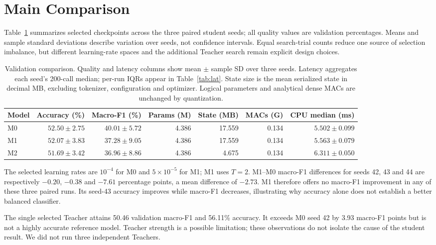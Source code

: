 \documentclass[11pt]{article}
\begin{document}
\section{Main Comparison}
Table~\ref{tab:main} summarizes selected checkpoints across the three paired student seeds; all quality values are validation percentages. Means and sample standard deviations describe variation over seeds, not confidence intervals. Equal search-trial counts reduce one source of selection imbalance, but different learning-rate spaces and the additional Teacher search remain explicit design choices.

\begin{table}[t]\centering\small
\begin{tabular}{lrrrrrr}\toprule
Model & Accuracy (\%) & Macro-F1 (\%) & Params (M) & State (MB) & MACs (G) & CPU median (ms)\\\midrule
M0 & $52.50\pm2.75$ & $40.01\pm5.72$ & 4.386 & 17.559 & 0.134 & $5.502\pm0.099$\\
M1 & $52.07\pm3.83$ & $37.28\pm9.05$ & 4.386 & 17.559 & 0.134 & $5.563\pm0.079$\\
M2 & $51.69\pm3.42$ & $36.96\pm8.86$ & 4.386 & 4.675 & 0.134 & $6.311\pm0.050$\\\bottomrule
\end{tabular}
\caption{Validation comparison. Quality and latency columns show mean $\pm$ sample SD over three seeds. Latency aggregates each seed's 200-call median; per-run IQRs appear in Table~\ref{tab:lat}. State size is the mean serialized state in decimal MB, excluding tokenizer, configuration and optimizer. Logical parameters and analytical dense MACs are unchanged by quantization.}\label{tab:main}
\end{table}

The selected learning rates are $10^{-4}$ for M0 and $5\times10^{-5}$ for M1; M1 uses $T=2$. M1--M0 macro-F1 differences for seeds 42, 43 and 44 are respectively $-0.20$, $-0.38$ and $-7.61$ percentage points, a mean difference of $-2.73$. M1 therefore offers no macro-F1 improvement in any of these three paired runs. Its seed-43 accuracy improves while macro-F1 decreases, illustrating why accuracy alone does not establish a better balanced classifier.

The single selected Teacher attains 50.46 validation macro-F1 and 56.11\% accuracy. It exceeds M0 seed 42 by 3.93 macro-F1 points but is not a highly accurate reference model. Teacher strength is a possible limitation; these observations do not isolate the cause of the student result. We did not run three independent Teachers.
\end{document}

